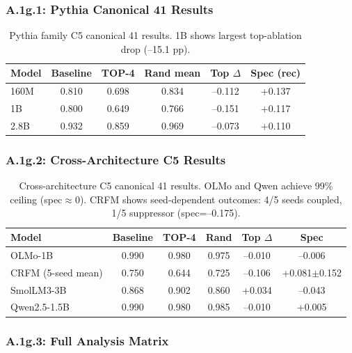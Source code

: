 \documentclass[10pt]{article} %
\begin{document}
\subsubsection*{A.1g.1: Pythia Canonical 41 Results}

\begin{table}[H]
\centering
\small
\begin{tabular}{|l|c|c|c|c|c|}
\hline
\textbf{Model} & \textbf{Baseline} & \textbf{TOP-4} & \textbf{Rand mean} & \textbf{Top $\Delta$} & \textbf{Spec (rec)} \\
\hline
160M & 0.810 & 0.698 & 0.834 & --0.112 & +0.137 \\
1B & 0.800 & 0.649 & 0.766 & --0.151 & +0.117 \\
2.8B & 0.932 & 0.859 & 0.969 & --0.073 & +0.110 \\
\hline
\end{tabular}
\caption{Pythia family C5 canonical 41 results. 1B shows largest top-ablation drop (--15.1 pp).}
\label{tab:a1g1_pythia_c5}
\end{table}

\subsubsection*{A.1g.2: Cross-Architecture C5 Results}

\begin{table}[H]
\centering
\small
\begin{tabular}{|l|c|c|c|c|c|}
\hline
\textbf{Model} & \textbf{Baseline} & \textbf{TOP-4} & \textbf{Rand} & \textbf{Top $\Delta$} & \textbf{Spec} \\
\hline
OLMo-1B & 0.990 & 0.980 & 0.975 & --0.010 & --0.006 \\
CRFM (5-seed mean) & 0.750 & 0.644 & 0.725 & --0.106 & +0.081$\pm$0.152 \\
SmolLM3-3B & 0.868 & 0.902 & 0.860 & +0.034 & --0.043 \\
Qwen2.5-1.5B & 0.990 & 0.980 & 0.985 & --0.010 & +0.005 \\
\hline
\end{tabular}
\caption{Cross-architecture C5 canonical 41 results. OLMo and Qwen achieve 99\% ceiling (spec$\approx$0). CRFM shows seed-dependent outcomes: 4/5 seeds coupled, 1/5 suppressor (spec=--0.175).}
\label{tab:c5_crossarch}
\end{table}

\subsubsection*{A.1g.3: Full Analysis Matrix}
\end{document}

